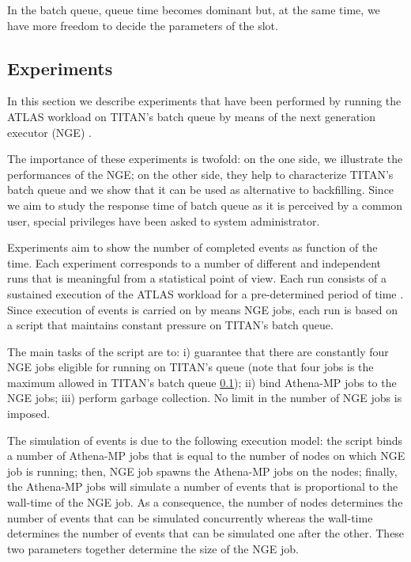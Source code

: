 In the batch queue,  queue time becomes dominant but, at the same time, we have more freedom to decide the parameters of the slot.

\subsection{Experiments}

In this section we describe experiments that have been performed by running the ATLAS workload on TITAN's batch queue by means of the next generation executor (NGE) .

The importance  of these experiments is twofold: on the one side, we illustrate the performances of the NGE; on the other side, they help to characterize TITAN's batch queue and we show that it can be used as alternative to backfilling. Since we aim to study the response time of batch queue as it is perceived by a common user,  special privileges have been asked to system administrator. 


Experiments aim to show  the number of completed events as function of the time. 
Each experiment corresponds to a number of different and independent runs that is meaningful from a statistical point of view.  Each run consists of a sustained execution of the ATLAS workload for a pre-determined period of time .  Since execution of events is carried on by means  NGE jobs, each run is based on a script that maintains constant pressure on TITAN's batch queue. 

The main tasks of the script are to:  i) guarantee that there are constantly four NGE jobs eligible for running on TITAN's queue (note that four jobs is the maximum allowed in TITAN's batch queue \ref{}); ii)  bind Athena-MP jobs to the NGE jobs; iii) perform garbage collection. No limit in the number of NGE jobs is imposed.

The simulation of events is due to the following execution model: the script binds a number of Athena-MP jobs that is equal to the number of nodes on which NGE job is running; then, NGE job spawns the Athena-MP jobs on the nodes; finally, the Athena-MP jobs will simulate a number of events that is proportional to the wall-time of the NGE job. As a consequence, the number of nodes determines the number of events that can be simulated concurrently whereas the wall-time determines the number of events that can be simulated one after the other. These two parameters together determine the size of the NGE job. 

